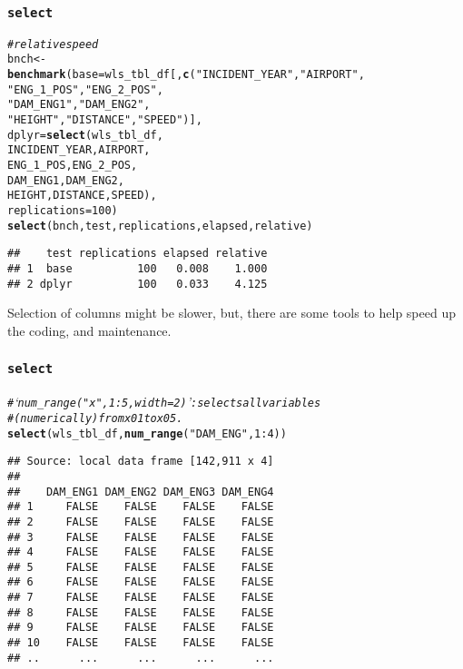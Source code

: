 \documentclass{beamer}\usepackage[]{graphicx}\usepackage[]{color}
\makeatletter
\newcommand{\hlnum}[1]{\textcolor[rgb]{0.686,0.059,0.569}{#1}}%
\newcommand{\hlstr}[1]{\textcolor[rgb]{0.192,0.494,0.8}{#1}}%
\newcommand{\hlcom}[1]{\textcolor[rgb]{0.678,0.584,0.686}{\textit{#1}}}%
\newcommand{\hlopt}[1]{\textcolor[rgb]{0,0,0}{#1}}%
\newcommand{\hlstd}[1]{\textcolor[rgb]{0.345,0.345,0.345}{#1}}%
\newcommand{\hlkwb}[1]{\textcolor[rgb]{0.69,0.353,0.396}{#1}}%
\newcommand{\hlkwc}[1]{\textcolor[rgb]{0.333,0.667,0.333}{#1}}%
\newcommand{\hlkwd}[1]{\textcolor[rgb]{0.737,0.353,0.396}{\textbf{#1}}}%
\newenvironment{kframe}{%
 \def\at@end@of@kframe{}%
 \ifinner\ifhmode%
  \def\at@end@of@kframe{\end{minipage}}%
  \begin{minipage}{\columnwidth}%
 \fi\fi%
 \def\FrameCommand##1{\hskip\@totalleftmargin \hskip-\fboxsep
 \colorbox{shadecolor}{##1}\hskip-\fboxsep
     \hskip-\linewidth \hskip-\@totalleftmargin \hskip\columnwidth}%
 \MakeFramed {\advance\hsize-\width
   \@totalleftmargin\z@ \linewidth\hsize
   \@setminipage}}%
 {\par\unskip\endMakeFramed%
 \at@end@of@kframe}
\newenvironment{knitrout}{}{} %
\makeatother
\begin{document}
\begin{frame}[fragile]
  \frametitle{{\tt select}}
\begin{knitrout}\footnotesize
{}\color{fgcolor}\begin{kframe}
\begin{alltt}
\hlcom{# relative speed }
\hlstd{bnch} \hlkwb{<-}
  \hlkwd{benchmark}\hlstd{(}\hlkwc{base}  \hlstd{= wls_tbl_df[,} \hlkwd{c}\hlstd{(}\hlstr{"INCIDENT_YEAR"}\hlstd{,} \hlstr{"AIRPORT"}\hlstd{,}
                                   \hlstr{"ENG_1_POS"}\hlstd{,} \hlstr{"ENG_2_POS"}\hlstd{,}
                                   \hlstr{"DAM_ENG1"}\hlstd{,} \hlstr{"DAM_ENG2"}\hlstd{,}
                                   \hlstr{"HEIGHT"}\hlstd{,} \hlstr{"DISTANCE"}\hlstd{,} \hlstr{"SPEED"}\hlstd{)],}
            \hlkwc{dplyr} \hlstd{=} \hlkwd{select}\hlstd{(wls_tbl_df,}
                           \hlstd{INCIDENT_YEAR, AIRPORT,}
                           \hlstd{ENG_1_POS, ENG_2_POS,}
                           \hlstd{DAM_ENG1, DAM_ENG2,}
                           \hlstd{HEIGHT, DISTANCE, SPEED),}
            \hlkwc{replications} \hlstd{=} \hlnum{100}\hlstd{)}
\hlkwd{select}\hlstd{(bnch, test, replications, elapsed, relative)}
\end{alltt}
\begin{verbatim}
##    test replications elapsed relative
## 1  base          100   0.008    1.000
## 2 dplyr          100   0.033    4.125
\end{verbatim}
\end{kframe}
\end{knitrout}

Selection of columns might be slower, but, there are some
tools to help speed up the coding, and maintenance.
\end{frame} 


\begin{frame}[fragile]
  \frametitle{{\tt select}}
\begin{knitrout}\footnotesize
{}\color{fgcolor}\begin{kframe}
\begin{alltt}
\hlcom{# ‘num_range("x", 1:5, width = 2)’: selects all variables}
\hlcom{# (numerically) from x01 to x05.}
\hlkwd{select}\hlstd{(wls_tbl_df,} \hlkwd{num_range}\hlstd{(}\hlstr{"DAM_ENG"}\hlstd{,} \hlnum{1}\hlopt{:}\hlnum{4}\hlstd{))}
\end{alltt}
\begin{verbatim}
## Source: local data frame [142,911 x 4]
## 
##    DAM_ENG1 DAM_ENG2 DAM_ENG3 DAM_ENG4
## 1     FALSE    FALSE    FALSE    FALSE
## 2     FALSE    FALSE    FALSE    FALSE
## 3     FALSE    FALSE    FALSE    FALSE
## 4     FALSE    FALSE    FALSE    FALSE
## 5     FALSE    FALSE    FALSE    FALSE
## 6     FALSE    FALSE    FALSE    FALSE
## 7     FALSE    FALSE    FALSE    FALSE
## 8     FALSE    FALSE    FALSE    FALSE
## 9     FALSE    FALSE    FALSE    FALSE
## 10    FALSE    FALSE    FALSE    FALSE
## ..      ...      ...      ...      ...
\end{verbatim}
\end{kframe}
\end{knitrout}
\end{frame} 
\end{document}
